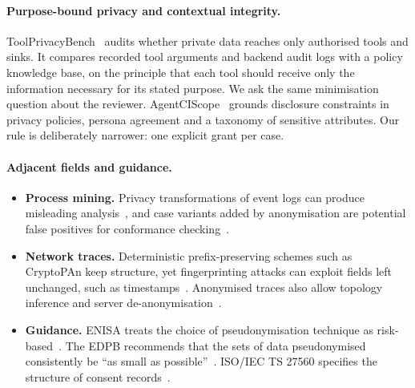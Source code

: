 \documentclass[11pt]{article}
\begin{document}
\paragraph{Purpose-bound privacy and contextual integrity.}
ToolPrivacyBench~\cite{hu2026toolprivacybench} audits whether private data reaches only authorised tools and sinks. It compares recorded tool arguments and backend audit logs with a policy knowledge base, on the principle that each tool should receive only the information necessary for its stated purpose. We ask the same minimisation question about the reviewer. AgentCIScope~\cite{guo2026agentciscope} grounds disclosure constraints in privacy policies, persona agreement and a taxonomy of sensitive attributes. Our rule is deliberately narrower: one explicit grant per case.

\paragraph{Adjacent fields and guidance.}
\begin{itemize}
  \item \textbf{Process mining.} Privacy transformations of event logs can produce misleading analysis~\cite{rafiei2021ppdp}, and case variants added by anonymisation are potential false positives for conformance checking~\cite{elkoumy2022dp}.
  \item \textbf{Network traces.} Deterministic prefix-preserving schemes such as CryptoPAn keep structure, yet fingerprinting attacks can exploit fields left unchanged, such as timestamps~\cite{mohammady2018multiview}. Anonymised traces also allow topology inference and server de-anonymisation~\cite{coull2007devil}.
  \item \textbf{Guidance.} ENISA treats the choice of pseudonymisation technique as risk-based~\cite{enisa2019pseudo}. The EDPB recommends that the sets of data pseudonymised consistently be ``as small as possible''~\cite{edpb2025pseudo}. ISO/IEC TS 27560 specifies the structure of consent records~\cite{iso27560}.
\end{itemize}
\end{document}
